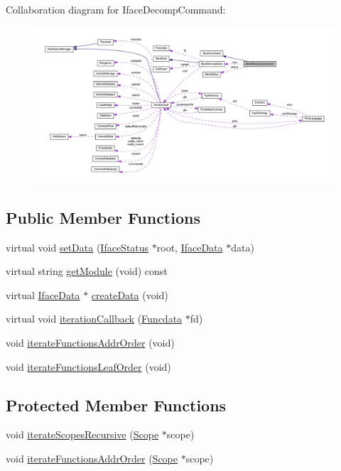 Collaboration diagram for Iface\+Decomp\+Command\+:
\nopagebreak
\begin{figure}[H]
\begin{center}
\leavevmode
\includegraphics[width=350pt]{class_iface_decomp_command__coll__graph}
\end{center}
\end{figure}
\subsection*{Public Member Functions}
\begin{DoxyCompactItemize}
\item 
virtual void \mbox{\hyperlink{class_iface_decomp_command_ad9bcf72bbdc7faddd7a23a1a4d127b0c}{set\+Data}} (\mbox{\hyperlink{class_iface_status}{Iface\+Status}} $\ast$root, \mbox{\hyperlink{class_iface_data}{Iface\+Data}} $\ast$data)
\item 
virtual string \mbox{\hyperlink{class_iface_decomp_command_aa1505dc6014dbdca5f922a826cd04b40}{get\+Module}} (void) const
\item 
virtual \mbox{\hyperlink{class_iface_data}{Iface\+Data}} $\ast$ \mbox{\hyperlink{class_iface_decomp_command_a9a4c2fccea348fbb80dc363dc6a39853}{create\+Data}} (void)
\item 
virtual void \mbox{\hyperlink{class_iface_decomp_command_a619d9358a4e77bef66a26f02ea7a6c8e}{iteration\+Callback}} (\mbox{\hyperlink{class_funcdata}{Funcdata}} $\ast$fd)
\item 
void \mbox{\hyperlink{class_iface_decomp_command_a070c2e1f98082c991af6cb5a727fbd6e}{iterate\+Functions\+Addr\+Order}} (void)
\item 
void \mbox{\hyperlink{class_iface_decomp_command_a9ad8fa5ad85876f4a085822fa9f04d48}{iterate\+Functions\+Leaf\+Order}} (void)
\end{DoxyCompactItemize}
\subsection*{Protected Member Functions}
\begin{DoxyCompactItemize}
\item 
void \mbox{\hyperlink{class_iface_decomp_command_a9f80fe6092ffac0f38a848eeae0b3773}{iterate\+Scopes\+Recursive}} (\mbox{\hyperlink{class_scope}{Scope}} $\ast$scope)
\item 
void \mbox{\hyperlink{class_iface_decomp_command_a002b0fafba1c9f44ae4255a45f604148}{iterate\+Functions\+Addr\+Order}} (\mbox{\hyperlink{class_scope}{Scope}} $\ast$scope)
\end{DoxyCompactItemize}
